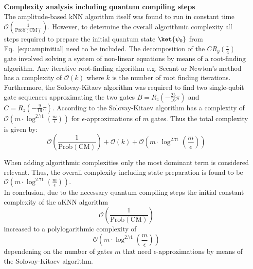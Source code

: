 \begin{greenbox}
\textbf{Complexity analysis including quantum compiling steps}\\
\newline
The amplitude-based kNN algorithm itself was found to run in constant time $\mathcal{O}(\frac{1}{\mathrm{Prob(CM)}})$. However, to determine the overall algorithmic complexity all steps required to prepare the initial quantum state $\ket{\psi_0}$ from Eq.~\ref{equ:ampinitial} need to be included. The decomposition of the $CR_y(\frac{\pi}{4})$ gate involved solving a system of non-linear equations by means of a root-finding algorithm. Any iterative root-finding algorithm e.g. Secant or Newton's method has a complexity of $\mathcal{O}(k)$ where $k$ is the number of root finding iterations. Furthermore, the Solovay-Kitaev algorithm was required to find two single-qubit gate sequences approximating the two gates $B = R_z(-\frac{23}{16}\pi)$ and $C = R_z(-\frac{9}{16}\pi)$. According to  the Solovay-Kitaev algorithm has a complexity of $\mathcal{O}(m\cdot \log^{2.71}(\frac{m}{\epsilon}))$ for $\epsilon$-approximations of $m$ gates. Thus the total complexity is given by:
\begin{equation}
\mathcal{O}(\frac{1}{\mathrm{Prob(CM)}})+\mathcal{O}(k)+\mathcal{O}(m\cdot \log^{2.71}(\frac{m}{\epsilon}))
\end{equation}
    
When adding algorithmic complexities only the most dominant term is considered relevant. Thus, the overall complexity including state preparation is found to be $\mathcal{O}(m\cdot \log^{2.71}(\frac{m}{\epsilon}))$.\\
\newline
In conclusion, due to the necessary quantum compiling steps the initial constant complexity of the aKNN algorithm
\begin{equation}  
\mathcal{O}(\frac{1}{\mathrm{Prob(CM)}})
\end{equation}
increased to a polylogarithmic complexity of
\begin{equation}
\mathcal{O}(m\cdot \log^{2.71}(\frac{m}{\epsilon}))
\end{equation}
dependening on the number of gates $m$ that need $\epsilon$-approximations by means of the Solovay-Kitaev algorithm.
\end{greenbox}

